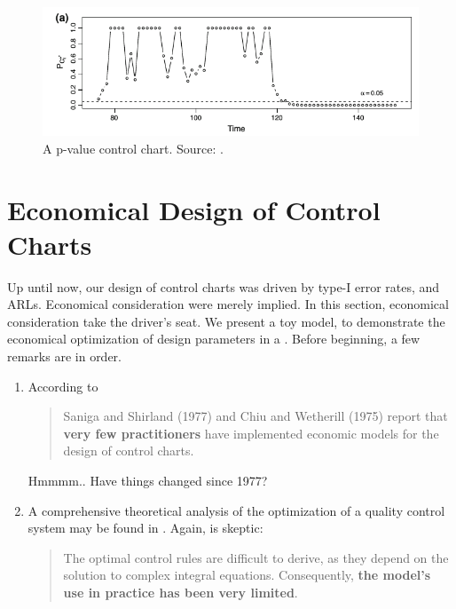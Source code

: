 \begin{figure}[t]
\centering
\includegraphics[width=0.7\linewidth]{art/p-value-chart}
\caption{A p-value control chart. Source: \cite{li_using_2012}.}
\label{fig:p-value-chart}
\end{figure}





\section{Economical Design of Control Charts}
\label{sec:economical_considerations}

Up until now, our design of control charts was driven by type-I error rates, and ARLs. Economical consideration were merely implied.
In this section, economical consideration take the driver's seat. 
We present a toy model, to demonstrate the economical optimization of design parameters in a \barxChart. 
Before beginning, a few remarks are in order. 

\begin{remark}
\noindent
\begin{enumerate}
\item According to \cite{montgomery_introduction_2007} 
\begin{quote}
Saniga and Shirland (1977) and Chiu and Wetherill (1975) report that \textbf{very few practitioners} have implemented economic models for the design of control charts.
\end{quote}
Hmmmm.. Have things changed since 1977?
\item A comprehensive theoretical analysis of the optimization of a quality control system may be found in \cite{girshick_bayes_1952}. Again, \cite{montgomery_introduction_2007} is skeptic:
\begin{quote}
The optimal control rules are difficult to derive, as they depend on the solution to complex integral equations. Consequently, \textbf{the model’s use in practice has been very limited}.
\end{quote}
\end{enumerate}
\end{remark}

